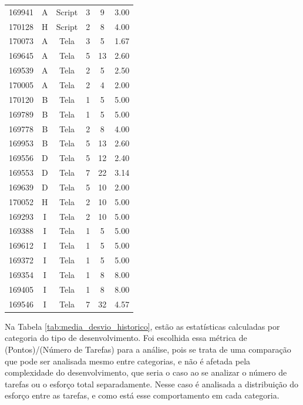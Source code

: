 \begin{longtable}{cccccc}
		169941 & A & Script & 3 & 9 & 3.00 \\
		170128 & H & Script & 2 & 8 & 4.00 \\
		170073 & A & Tela & 3 & 5 & 1.67 \\
		169645 & A & Tela & 5 & 13 & 2.60 \\
		169539 & A & Tela & 2 & 5 & 2.50 \\
		170005 & A & Tela & 2 & 4 & 2.00 \\
		170120 & B & Tela & 1 & 5 & 5.00 \\
		169789 & B & Tela & 1 & 5 & 5.00 \\
		169778 & B & Tela & 2 & 8 & 4.00 \\
		169953 & B & Tela & 5 & 13 & 2.60 \\
		169556 & D & Tela & 5 & 12 & 2.40 \\
		169553 & D & Tela & 7 & 22 & 3.14 \\
		169639 & D & Tela & 5 & 10 & 2.00 \\
		170052 & H & Tela & 2 & 10 & 5.00 \\
		169293 & I & Tela & 2 & 10 & 5.00 \\
		169388 & I & Tela & 1 & 5 & 5.00 \\
		169612 & I & Tela & 1 & 5 & 5.00 \\
		169372 & I & Tela & 1 & 5 & 5.00 \\
		169354 & I & Tela & 1 & 8 & 8.00 \\
		169405 & I & Tela & 1 & 8 & 8.00 \\
		169546 & I & Tela & 7 & 32 & 4.57 \\
	\end{longtable}
	
	Na Tabela \ref{tab:media_desvio_historico}, estão as estatísticas calculadas por categoria do tipo de desenvolvimento. Foi escolhida essa métrica de (Pontos)/(Número de Tarefas) para
	a análise, pois se trata de uma comparação que pode ser analisada mesmo entre categorias, e não é afetada pela complexidade do desenvolvimento, que seria o caso ao se analizar o número de tarefas ou
	o esforço total separadamente. Nesse caso é analisada a distribuição do esforço entre as tarefas, e como está esse comportamento em cada categoria.

